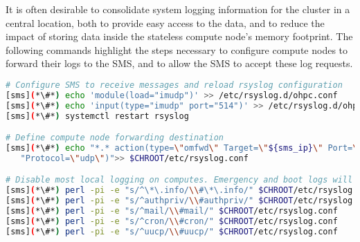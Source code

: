 It is often desirable to consolidate system logging information for the cluster in a
central location, both to provide easy access to the data, and to reduce the
impact of storing data inside the stateless compute node's memory footprint. The
following commands highlight the steps necessary to configure compute nodes to
forward their logs to the SMS, and to allow the SMS to accept these log requests.


\begin{lstlisting}[language=bash,keywords={},upquote=true]
# Configure SMS to receive messages and reload rsyslog configuration
[sms](*\#*) echo 'module(load="imudp")' >> /etc/rsyslog.d/ohpc.conf
[sms](*\#*) echo 'input(type="imudp" port="514")' >> /etc/rsyslog.d/ohpc.conf
[sms](*\#*) systemctl restart rsyslog

# Define compute node forwarding destination
[sms](*\#*) echo "*.* action(type=\"omfwd\" Target=\"${sms_ip}\" Port=\"514\" " \
   "Protocol=\"udp\")">> $CHROOT/etc/rsyslog.conf

# Disable most local logging on computes. Emergency and boot logs will remain on the compute nodes
[sms](*\#*) perl -pi -e "s/^\*\.info/\\#\*\.info/" $CHROOT/etc/rsyslog.conf
[sms](*\#*) perl -pi -e "s/^authpriv/\\#authpriv/" $CHROOT/etc/rsyslog.conf
[sms](*\#*) perl -pi -e "s/^mail/\\#mail/" $CHROOT/etc/rsyslog.conf
[sms](*\#*) perl -pi -e "s/^cron/\\#cron/" $CHROOT/etc/rsyslog.conf
[sms](*\#*) perl -pi -e "s/^uucp/\\#uucp/" $CHROOT/etc/rsyslog.conf

\end{lstlisting}

